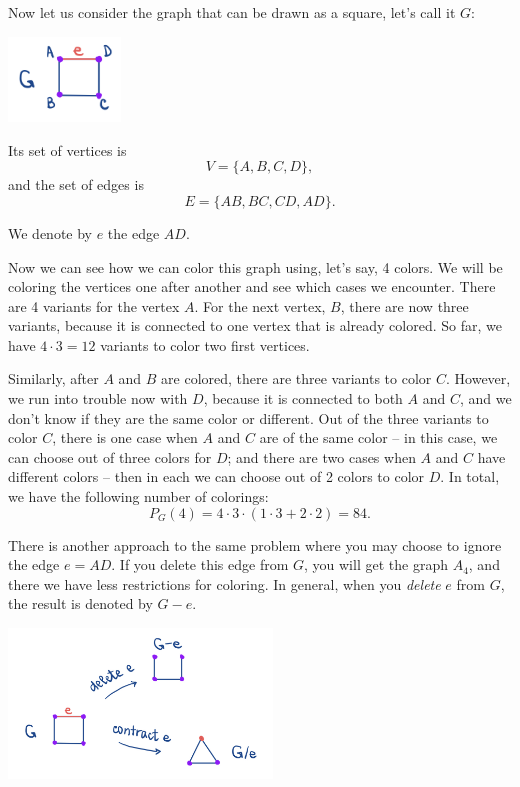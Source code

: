\begin{example}
\label{ex:coloring_square}
Now let us consider the graph that can be drawn as a square, let's call it $G$:

\begin{center}
\includegraphics[width=3cm]{pics/coloring_square.jpg}
\end{center}

Its set of vertices is
$$ V = \{ A,B,C,D \}
,$$
and the set of edges is 
$$ E = \{AB,BC,CD,AD\}
.$$

We denote by $e$ the edge $AD$.

Now we can see how we can color this graph using, let's say, 4 colors. We will be coloring the vertices one after another and see which cases we encounter. There are 4 variants for the vertex $A$. For the next vertex, $B$, there are now three variants, because it is connected to one vertex that is already colored. So far, we have $4\cdot 3 = 12$ variants to color two first vertices.

Similarly, after $A$ and $B$ are colored, there are three variants to color $C$. However, we run into trouble now with $D$, because it is connected to both $A$ and $C$, and we don't know if they are the same color or different. Out of the three variants to color $C$, there is one case when $A$ and $C$ are of the same color -- in this case, we can choose out of three colors for $D$; and there are two cases when $A$ and $C$ have different colors -- then in each we can choose out of 2 colors to color $D$. In total, we have the following number of colorings:
$$ P_G(4) = 4 \cdot 3 \cdot (1 \cdot 3 + 2 \cdot 2) = 84
.$$
\end{example}

There is another approach to the same problem where you may choose to ignore the edge $e = AD$. If you delete this edge from $G$, you will get the graph $A_4$, and there we have less restrictions for coloring. In general, when you \emph{delete} $e$ from $G$, the result is denoted by $G-e$.

\begin{center}
\includegraphics[width=7cm]{pics/coloring_square_deletecontract.jpg}
\end{center}

